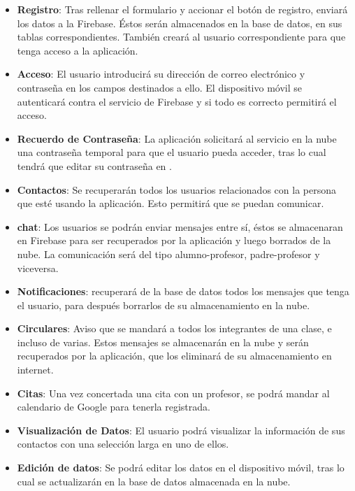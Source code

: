 		\begin{itemize} 
			\item {\bf Registro}: Tras rellenar el formulario y accionar el botón de registro, \CollegeApp enviará los datos a la Firebase. Éstos serán almacenados en la base de datos, en sus tablas correspondientes. También creará al usuario correspondiente para que tenga acceso a la aplicación.
			\item {\bf Acceso}: El usuario introducirá su dirección de correo electrónico y contraseña en los campos destinados a ello. El dispositivo móvil se autenticará contra el servicio de Firebase y si todo es correcto permitirá el acceso.
			\item {\bf Recuerdo de Contraseña}: La aplicación solicitará al servicio en la nube una contraseña temporal para que el usuario pueda acceder, tras lo cual tendrá que editar su contraseña en \CollegeApp.
			\item {\bf Contactos}: Se recuperarán todos los usuarios relacionados con la persona que esté usando la aplicación. Esto permitirá que se puedan comunicar.
			\item {\bf chat}: Los usuarios se podrán enviar mensajes entre sí, éstos se almacenaran en Firebase para ser recuperados por la aplicación y luego borrados de la nube. La comunicación será del tipo alumno-profesor, padre-profesor y viceversa.
			\item {\bf Notificaciones}: \CollegeApp recuperará de la base de datos todos los mensajes que tenga el usuario, para después borrarlos de su almacenamiento en la nube.
			\item {\bf Circulares}: Aviso que se mandará a todos los integrantes de una clase, e incluso de varias. Estos mensajes se almacenarán en la nube y serán recuperados por la aplicación, que los eliminará de su almacenamiento en internet.
			\item {\bf Citas}: Una vez concertada una cita con un profesor, se podrá mandar al calendario de Google para tenerla registrada.
			\item {\bf Visualización de Datos}: El usuario podrá visualizar la información de sus contactos con una selección larga en uno de ellos.
			\item {\bf Edición de datos}: Se podrá editar los datos en el dispositivo móvil, tras lo cual se actualizarán en la base de datos almacenada en la nube. 
		\end{itemize}

